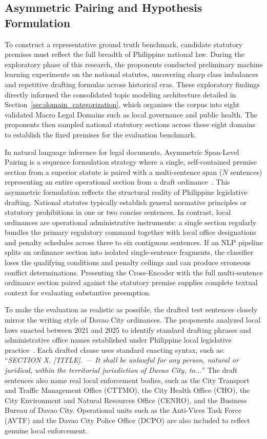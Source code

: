     \subsection{Asymmetric Pairing and Hypothesis Formulation}
    \label{sec:span_pairing}
    To construct a representative ground truth benchmark, candidate statutory premises must reflect the full breadth of Philippine national law. During the exploratory phase of this research, the proponents conducted preliminary machine learning experiments on the national statutes, uncovering sharp class imbalances and repetitive drafting formulas across historical eras. These exploratory findings directly informed the consolidated topic modeling architecture detailed in Section~\ref{sec:domain_categorization}, which organizes the corpus into eight validated Macro Legal Domains such as local governance and public health. The proponents then sampled national statutory sections across these eight domains to establish the fixed premises for the evaluation benchmark.

    In natural language inference for legal documents, Asymmetric Span-Level Pairing is a sequence formulation strategy where a single, self-contained premise section from a superior statute is paired with a multi-sentence span ($N$ sentences) representing an entire operational section from a draft ordinance~\cite{yin2021docnli, koreeda2021contract}. This asymmetric formulation reflects the structural reality of Philippine legislative drafting. National statutes typically establish general normative principles or statutory prohibitions in one or two concise sentences. In contrast, local ordinances are operational administrative instruments: a single section regularly bundles the primary regulatory command together with local office designations and penalty schedules across three to six contiguous sentences. If an NLP pipeline splits an ordinance section into isolated single-sentence fragments, the classifier loses the qualifying conditions and penalty ceilings and can produce erroneous conflict determinations. Presenting the Cross-Encoder with the full multi-sentence ordinance section paired against the statutory premise supplies complete textual context for evaluating substantive preemption.

    To make the evaluation as realistic as possible, the drafted test sentences closely mirror the writing style of Davao City ordinances. The proponents analyzed local laws enacted between 2021 and 2025 to identify standard drafting phrases and administrative office names established under Philippine local legislative practice~\cite{philgov1991ra7160, spdc2022ra00122}. Each drafted clause uses standard enacting syntax, such as: ``\textit{SECTION X. [TITLE]. --- It shall be unlawful for any person, natural or juridical, within the territorial jurisdiction of Davao City, to...}'' The draft sentences also name real local enforcement bodies, such as the City Transport and Traffic Management Office (CTTMO), the City Health Office (CHO), the City Environment and Natural Resources Office (CENRO), and the Business Bureau of Davao City. Operational units such as the Anti-Vices Task Force (AVTF) and the Davao City Police Office (DCPO) are also included to reflect genuine local enforcement.

